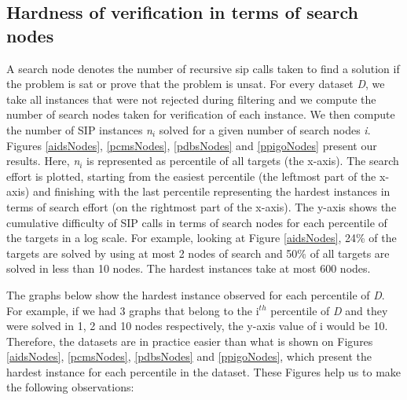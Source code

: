 \documentclass{l4proj}
\newcounter{example}[section]
\begin{document}
\subsection{Hardness of verification in terms of search nodes}
\label{subsec:hardnessVerifcNodes}
A search node denotes the number of recursive \gls{sip} calls taken to find a solution if the problem is \gls{sat} or prove that the problem is \gls{unsat}. For every dataset \emph{D}, we take all instances that were not rejected during filtering and we compute the number of search nodes taken for verification of each instance. We then compute the number of SIP instances \emph{n$_{i}$} solved for a given number of search nodes \emph{i}. Figures \ref{aidsNodes}, \ref{pcmsNodes}, \ref{pdbsNodes} and \ref{ppigoNodes} present our results. Here, \emph{n$_{i}$} is represented as percentile of all targets (the x-axis). The search effort is plotted, starting from the easiest percentile (the leftmost part of the x-axis) and finishing with the last percentile representing the hardest instances in terms of search effort (on the rightmost part of the x-axis). The y-axis shows the cumulative difficulty of SIP calls in terms of search nodes for each percentile of the targets in a log scale. For example, looking at Figure \ref{aidsNodes}, 24\% of the targets are solved by using at most 2 nodes of search and 50\% of all targets are solved in less than 10 nodes. The hardest instances take at most 600 nodes.

The graphs below show the hardest instance observed for each percentile of \emph{D}. For example, if we had 3 graphs that belong to the i$^{th}$ percentile of \emph{D} and they were solved in 1, 2 and 10 nodes respectively, the y-axis value of i would be 10. Therefore, the datasets are in practice easier than what is shown on Figures \ref{aidsNodes}, \ref{pcmsNodes}, \ref{pdbsNodes} and \ref{ppigoNodes}, which present the hardest instance for each percentile in the dataset. These Figures help us to make the following observations:
\end{document}
